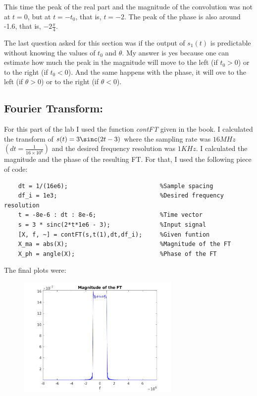 \documentclass[a4paper,11pt]{article}
\begin{document}
This time the peak of the real part and the magnitude of the convolution was not at $t = 0$, but at $t = -t_{0}$, that is, $t = -2$. The peak of the phase is also around -1.6, that is, $-2\frac{\pi}{4}$.

The last question asked for this section was if the output of $s_{1}(t)$ is predictable without knowing the values of $t_{0}$ and $\theta$. My answer is yes because one can estimate how much the peak in the magnitude will move to the left (if $t_{0} > 0$) or to the right (if $t_{0} < 0$). And the same happens with the phase, it will ove to the left (if $\theta > 0$) or to the right (if $\theta < 0$).

\subsection{Fourier Transform:}

For this part of the lab I used the function \textit{contFT} given in the book. I calculated the transform of $s(t) = 3\sinc (2t-3)$ where the sampling rate was $16MHz$ $(dt = \frac{1}{16\times 10^{6}})$ and the desired frequency resolution was $1 KHz$. I calculated the magnitude and the phase of the resulting FT. For that, I used the following piece of code:

\bigskip

\begin{lstlisting}
    dt = 1/(16e6);                          %Sample spacing
    df_i = 1e3;                             %Desired frequency resolution
    t = -8e-6 : dt : 8e-6;                  %Time vector
    s = 3 * sinc(2*t*1e6 - 3);              %Input signal
    [X, f, ~] = contFT(s,t(1),dt,df_i);     %Given funtion
    X_ma = abs(X);                          %Magnitude of the FT
    X_ph = angle(X);                        %Phase of the FT
\end{lstlisting}

\bigskip

The final plots were:

\begin{figure}[!hp]
    \begin{center}
      \includegraphics[width=0.7\textwidth]{images/exercice_4a.png}
    \end{center}
\end{figure}
\end{document}
